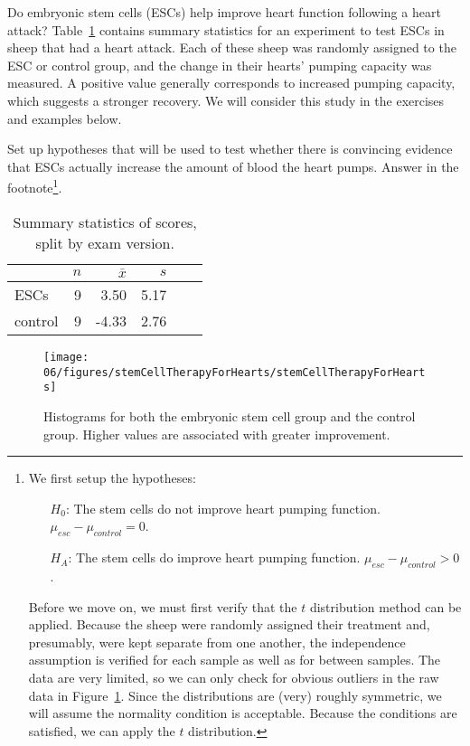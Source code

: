 Do embryonic stem cells (ESCs) help improve heart function following a heart attack? Table~\ref{summaryStatsForSheepHeartDataWhoReceivedMiceESCs} contains summary statistics for an experiment to test ESCs in sheep that had a heart attack. Each of these sheep was randomly assigned to the ESC or control group, and the change in their hearts' pumping capacity was measured. A positive value generally corresponds to increased pumping capacity, which suggests a stronger recovery. We will consider this study in the exercises and examples below.

\begin{exercise} \label{exerciseToEvaluteWhetherESCsAreHelpfulInImprovingHeartFunctionInSheep}
Set up hypotheses that will be used to test whether there is convincing evidence that ESCs actually increase the amount of blood the heart pumps. Answer in the footnote\footnote{We first setup the hypotheses:
\begin{itemize}
\item[$H_0$:] The stem cells do not improve heart pumping function. $\mu_{esc} - \mu_{control} = 0$.
\item[$H_A$:] The stem cells do improve heart pumping function. $\mu_{esc} - \mu_{control} > 0$.
\end{itemize}
Before we move on, we must first verify that the $t$ distribution method can be applied. Because the sheep were randomly assigned their treatment and, presumably, were kept separate from one another, the independence assumption is verified for each sample as well as for between samples. The data are very limited, so we can only check for obvious outliers in the raw data in Figure~\ref{stemCellTherapyForHearts}. Since the distributions are (very) roughly symmetric, we will assume the normality condition is acceptable. Because the conditions are satisfied, we can apply the $t$ distribution.}.
\end{exercise}
\begin{table}
\centering
\begin{tabular}{l rrrrr}
\hline
\hspace{10mm}	& $n$	& $\bar{x}$	& $s$  	 \\
\hline
ESCs		& 9		& 3.50		& 5.17  	\\
control		& 9		& -4.33		& 2.76  	 \\
\hline
\end{tabular}
\caption{Summary statistics of scores, split by exam version.}
\label{summaryStatsForSheepHeartDataWhoReceivedMiceESCs}
\end{table}
\begin{figure}
\centering
\texttt{[image: 06/figures/stemCellTherapyForHearts/stemCellTherapyForHearts]}
\caption{Histograms for both the embryonic stem cell group and the control group. Higher values are associated with greater improvement.}
\label{stemCellTherapyForHearts}
\end{figure}

